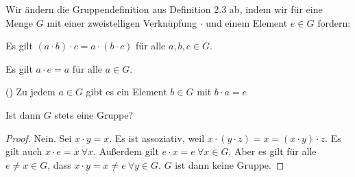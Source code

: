 \begin{Problem}
	Wir ändern die Gruppendefinition aus Definition 2.3 ab, indem wir für eine Menge $G$ mit einer zweistelligen Verknüpfung $\cdot$ und einem Element $e\in G$ fordern:
	\begin{parts}
		\item Es gilt $(a\cdot b)\cdot c=a\cdot(b\cdot c)$ für alle $a,b,c\in G$.	
		\item Es gilt $a\cdot e=a$ für alle $a\in G$.
 \item[\refstepcounter{enumi}(\alph{enumi}\textquotesingle)] Zu jedem $a \in G$ gibt es ein Element $b\in G$ mit $b\cdot a = e$
	\end{parts}
Ist dann $G$ stets eine Gruppe?
\end{Problem}
\begin{proof}
	Nein. Sei $x\cdot y=x$. Es ist assoziativ, weil $x\cdot (y \cdot z)=x=(x\cdot y)\cdot z$. Es gilt auch $x\cdot e=x~\forall x$. Außerdem gilt $e\cdot x=e~\forall x\in G$. 
	Aber es gilt f\"{u}r alle $e\neq x\in G$, dass $x\cdot y=x\neq e~\forall y \in G$. $G$ ist dann keine Gruppe.
\end{proof}

